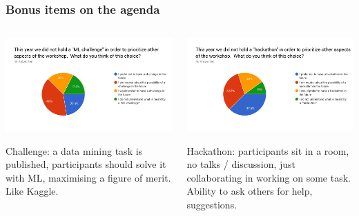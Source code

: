 \begin{frame}
  \frametitle{Bonus items on the agenda}
  \begin{columns}
    \begin{column}{.48\textwidth}
      \includegraphics[width=\textwidth]{./challenge.png}

      {\footnotesize{

        Challenge: a data mining task is published, participants should solve it with ML, maximising a figure of merit. Like Kaggle.

      }}
    \end{column}
    \begin{column}{.48\textwidth}
      \includegraphics[width=\textwidth]{./hackathon.png}

      {\footnotesize{

        Hackathon: participants sit in a room, no talks / discussion, just collaborating in working on some task. Ability to ask others for help, suggestions.

      }}
    \end{column}
  \end{columns}

\end{frame}

